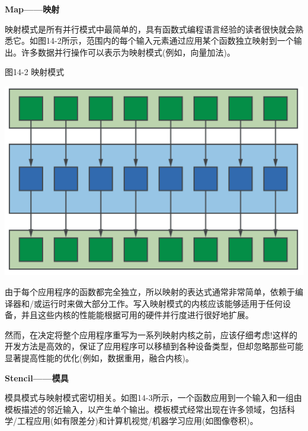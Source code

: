 \hspace*{\fill} \par %
\textbf{Map——映射}

映射模式是所有并行模式中最简单的，具有函数式编程语言经验的读者很快就会熟悉它。如图14-2所示，范围内的每个输入元素通过应用某个函数独立映射到一个输出。许多数据并行操作可以表示为映射模式(例如，向量加法)。\par

\hspace*{\fill} \par %
图14-2 映射模式
\begin{center}
	\includegraphics[width=1.\textwidth]{content/chapter-14/images/2}
\end{center}

由于每个应用程序的函数都完全独立，所以映射的表达式通常非常简单，依赖于编译器和/或运行时来做大部分工作。写入映射模式的内核应该能够适用于任何设备，并且这些内核的性能能根据可用的硬件并行度进行很好地扩展。\par

然而，在决定将整个应用程序重写为一系列映射内核之前，应该仔细考虑!这样的开发方法是高效的，保证了应用程序可以移植到各种设备类型，但却忽略那些可能显著提高性能的优化(例如，数据重用，融合内核)。\par

\hspace*{\fill} \par %
\textbf{Stencil——模具}

模具模式与映射模式密切相关。如图14-3所示，一个函数应用到一个输入和一组由模板描述的邻近输入，以产生单个输出。模板模式经常出现在许多领域，包括科学/工程应用(如有限差分)和计算机视觉/机器学习应用(如图像卷积)。\par

